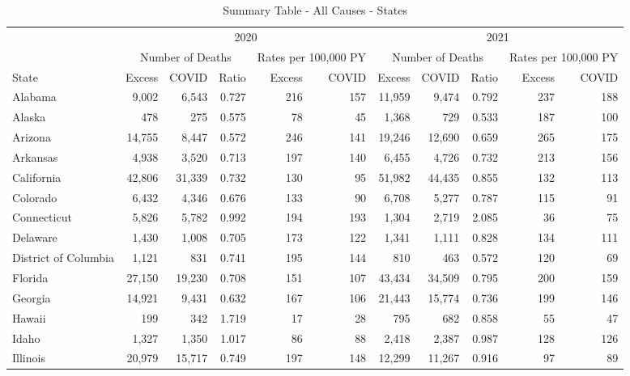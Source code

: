 \documentclass[
]{article}
\begin{document}
\begin{table}

\caption{\label{tab:unnamed-chunk-10}Summary Table - All Causes - States}
\centering
\fontsize{7.5}{9.5}\selectfont
\begin{tabular}[t]{lrrrrrrrrrr}
\toprule
\multicolumn{1}{c}{ } & \multicolumn{5}{c}{2020} & \multicolumn{5}{c}{2021} \\
\cmidrule(l{3pt}r{3pt}){2-6} \cmidrule(l{3pt}r{3pt}){7-11}
\multicolumn{1}{c}{ } & \multicolumn{3}{c}{Number of Deaths} & \multicolumn{2}{c}{Rates per 100,000 PY} & \multicolumn{3}{c}{Number of Deaths} & \multicolumn{2}{c}{Rates per 100,000 PY} \\
\cmidrule(l{3pt}r{3pt}){2-4} \cmidrule(l{3pt}r{3pt}){5-6} \cmidrule(l{3pt}r{3pt}){7-9} \cmidrule(l{3pt}r{3pt}){10-11}
State & Excess & COVID & Ratio & Excess & COVID & Excess & COVID & Ratio & Excess & COVID\\
\midrule
Alabama & 9,002 & 6,543 & 0.727 & 216 & 157 & 11,959 & 9,474 & 0.792 & 237 & 188\\
Alaska & 478 & 275 & 0.575 & 78 & 45 & 1,368 & 729 & 0.533 & 187 & 100\\
Arizona & 14,755 & 8,447 & 0.572 & 246 & 141 & 19,246 & 12,690 & 0.659 & 265 & 175\\
Arkansas & 4,938 & 3,520 & 0.713 & 197 & 140 & 6,455 & 4,726 & 0.732 & 213 & 156\\
California & 42,806 & 31,339 & 0.732 & 130 & 95 & 51,982 & 44,435 & 0.855 & 132 & 113\\
\addlinespace
Colorado & 6,432 & 4,346 & 0.676 & 133 & 90 & 6,708 & 5,277 & 0.787 & 115 & 91\\
Connecticut & 5,826 & 5,782 & 0.992 & 194 & 193 & 1,304 & 2,719 & 2.085 & 36 & 75\\
Delaware & 1,430 & 1,008 & 0.705 & 173 & 122 & 1,341 & 1,111 & 0.828 & 134 & 111\\
District of Columbia & 1,121 & 831 & 0.741 & 195 & 144 & 810 & 463 & 0.572 & 120 & 69\\
Florida & 27,150 & 19,230 & 0.708 & 151 & 107 & 43,434 & 34,509 & 0.795 & 200 & 159\\
\addlinespace
Georgia & 14,921 & 9,431 & 0.632 & 167 & 106 & 21,443 & 15,774 & 0.736 & 199 & 146\\
Hawaii & 199 & 342 & 1.719 & 17 & 28 & 795 & 682 & 0.858 & 55 & 47\\
Idaho & 1,327 & 1,350 & 1.017 & 86 & 88 & 2,418 & 2,387 & 0.987 & 128 & 126\\
Illinois & 20,979 & 15,717 & 0.749 & 197 & 148 & 12,299 & 11,267 & 0.916 & 97 & 89\\

\end{tabular}
\end{table}
\end{document}
